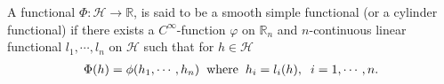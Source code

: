 	A functional $\Phi: \mathcal{H} \longrightarrow  \mathbb{R}$, is said to be a smooth simple functional (or a cylinder functional) if there exists a $C^{\infty} $-function $\varphi$ on $\mathbb{R}_n$ and $n$-continuous linear functional $l_1 ,\cdots ,l_n$ on $\mathcal{H}$ such that for $h \in \mathcal{H}$
	\begin{align*}
		\Phi(h) = \phi(h_1, \cdots, h_n) \hspace{2mm} \text{where} \hspace{2mm} h_i = l_i (h), \hspace{2mm} i = 1, \cdots, n.
	\end{align*}	